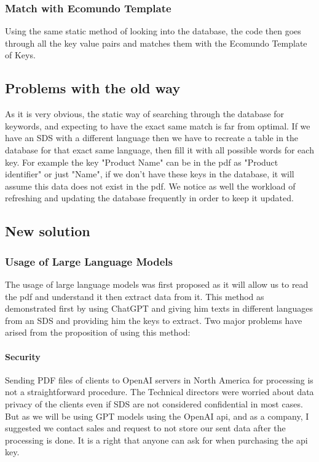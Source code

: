 \documentclass[a4paper,12pt,twoside]{report}
\begin{document}
\subsubsection{Match with Ecomundo Template}
Using the same static method of looking into the database, the code then goes through all the key value pairs and matches them with the Ecomundo Template of Keys. 
\subsection{Problems with the old way}
As it is very obvious, the static way of searching through the database for keywords, and expecting to have the exact same match is far from optimal. If we have an SDS with a different language then we have to recreate a table in the database for that exact same language, then fill it with all possible words for each key. For example the key "Product Name" can be in the pdf as "Product identifier" or just "Name", if we don't have these keys in the database, it will assume this data does not exist in the pdf.
We notice as well the workload of refreshing and updating the database frequently in order to keep it updated.
\subsection{New solution}
\subsubsection{Usage of Large Language Models}
The usage of large language models was first proposed as it will allow us to read the pdf and understand it then extract data from it. This method as demonstrated first by using ChatGPT and giving him texts in different languages from an SDS and providing him the keys to extract. Two major problems have arised from the proposition of using this method:
\paragraph{Security}
Sending PDF files of clients to OpenAI servers in North America for processing is not a straightforward procedure. The Technical directors were worried about data privacy of the clients even if SDS are not considered confidential in most cases. But as we will be using GPT models using the OpenAI api, and as a company, I suggested we contact sales and request to not store our sent data after the processing is done. It is a right that anyone can ask for when purchasing the api key\cite{openaiUP}.
\end{document}
